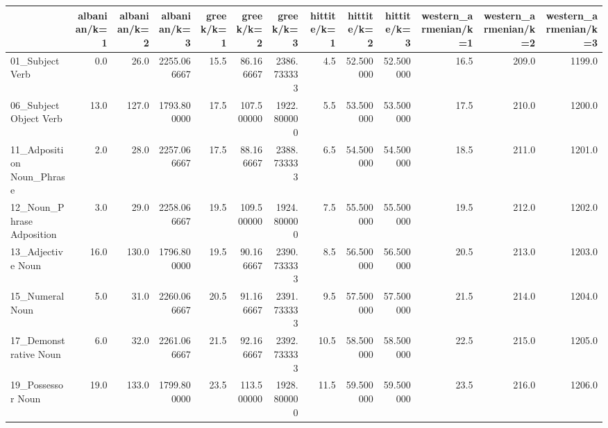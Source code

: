 \begin{tabular}{lrrrrrrrrrrrr}
\toprule
{} &  albanian/k=1 &  albanian/k=2 &  albanian/k=3 &  greek/k=1 &   greek/k=2 &    greek/k=3 &  hittite/k=1 &  hittite/k=2 &  hittite/k=3 &  western\_armenian/k=1 &  western\_armenian/k=2 &  western\_armenian/k=3 \\
\midrule
01\_Subject Verb                                    &           0.0 &          26.0 &   2255.066667 &       15.5 &   86.166667 &  2386.733333 &          4.5 &    52.500000 &    52.500000 &                  16.5 &                 209.0 &                1199.0 \\
06\_Subject Object Verb                             &          13.0 &         127.0 &   1793.800000 &       17.5 &  107.500000 &  1922.800000 &          5.5 &    53.500000 &    53.500000 &                  17.5 &                 210.0 &                1200.0 \\
11\_Adposition Noun\_Phrase                          &           2.0 &          28.0 &   2257.066667 &       17.5 &   88.166667 &  2388.733333 &          6.5 &    54.500000 &    54.500000 &                  18.5 &                 211.0 &                1201.0 \\
12\_Noun\_Phrase Adposition                          &           3.0 &          29.0 &   2258.066667 &       19.5 &  109.500000 &  1924.800000 &          7.5 &    55.500000 &    55.500000 &                  19.5 &                 212.0 &                1202.0 \\
13\_Adjective Noun                                  &          16.0 &         130.0 &   1796.800000 &       19.5 &   90.166667 &  2390.733333 &          8.5 &    56.500000 &    56.500000 &                  20.5 &                 213.0 &                1203.0 \\
15\_Numeral Noun                                    &           5.0 &          31.0 &   2260.066667 &       20.5 &   91.166667 &  2391.733333 &          9.5 &    57.500000 &    57.500000 &                  21.5 &                 214.0 &                1204.0 \\
17\_Demonstrative Noun                              &           6.0 &          32.0 &   2261.066667 &       21.5 &   92.166667 &  2392.733333 &         10.5 &    58.500000 &    58.500000 &                  22.5 &                 215.0 &                1205.0 \\
19\_Possessor Noun                                  &          19.0 &         133.0 &   1799.800000 &       23.5 &  113.500000 &  1928.800000 &         11.5 &    59.500000 &    59.500000 &                  23.5 &                 216.0 &                1206.0 \\

\end{tabular}
